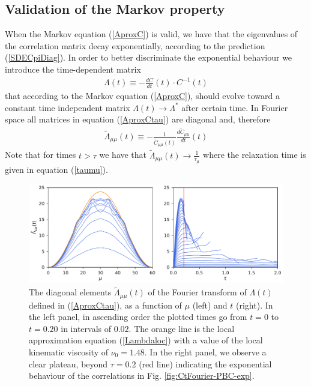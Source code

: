 \documentclass[b5paper,openright,10pt]{book}
\newcommand{\esc}{\!\cdot\!}
\begin{document}
\subsection{Validation of the Markov property}
\label{Sec:ValidateMarkovPBC}
When the  Markov equation (\ref{AproxC})  is valid, we have  that the
eigenvalues of  the correlation matrix decay  exponentially, according
to the prediction (\ref{SDECpiDiag}).  In order to better discriminate
the exponential behaviour we introduce the time-dependent matrix
\begin{align}
\Lambda(t)\equiv-    \frac{dC}{dt}(t)\esc C^{-1}(t)
\label{AproxCtau}
\end{align}
that according  to the Markov equation  (\ref{AproxC}), should evolve
toward a constant time  independent matrix $ \Lambda(t)\to \Lambda^*$
after   certain  time.   In  Fourier   space  all   matrices  in   equation
(\ref{AproxCtau}) are diagonal and, therefore
\begin{align}
\tilde{\Lambda}_{\mu\mu}(t)\equiv -    \frac{1}{\tilde{C}_{\mu\mu}(t)}\frac{d\tilde{C}_{\mu\mu}}{dt}(t)
\label{AproxCtau2}
\end{align}
Note that for times $t>\tau$ we have that $\tilde{\Lambda}_{\mu\mu}(t)\to \frac{1}{\tau_\mu}$
where the relaxation time is given in equation (\ref{taumu}).
\begin{figure}[h!]
  \centering
\includegraphics[width=\linewidth]{LambdatFourier-PBC}
\caption[Diagonal elements  $\tilde{\Lambda}_{\mu\mu}(t)$ of  the Fourier transform of $\Lambda(t)$ for an unconfined fluid]{The  diagonal elements  $\tilde{\Lambda}_{\mu\mu}(t)$ of  the
  Fourier transform of $\Lambda(t)$ defined in (\ref{AproxCtau}), as a
  function of  $\mu$ (left)  and $t$  (right).  In  the left  panel, in
  ascending  order the  plotted times  go  from $t=0$  to $t=0.20$  in
  intervals of $0.02$.  The orange line is the local approximation equation
  (\ref{Lambdaloc}) with a  value of the local  kinematic viscosity of
  $\nu_0=1.48$.   In the  right panel,  we observe  a clear  plateau,
  beyond  $\tau=0.2$ (red line) indicating  the  exponential  behaviour  of  the
  correlations in Fig. \ref{fig:CtFourier-PBC-exp}.}
\label{fig:LambdatFourier-PBC}
\end{figure}
\end{document}
